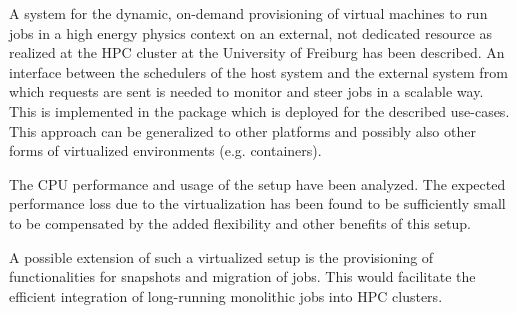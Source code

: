 A system for the dynamic, on-demand provisioning of virtual machines to run jobs
in a high energy physics context on an external, not dedicated resource as
realized at the HPC cluster \NEMO at the University of Freiburg has been
described. An interface between the schedulers of the
host system and the external system from which requests are sent is needed to
monitor and steer jobs in a scalable way. This is implemented in the \Roced package
which is deployed for the described use-cases.
This approach can be generalized to other platforms and possibly also other
forms of virtualized environments (e.g. containers).

The CPU performance and usage of the setup have been analyzed.
The expected performance loss due to the virtualization has been found to be
sufficiently small to be compensated by the added flexibility and other benefits
of this setup.

A possible extension of such a virtualized setup is the provisioning of functionalities
for snapshots and migration of jobs. This would facilitate the efficient integration of
long-running monolithic jobs into HPC clusters.


